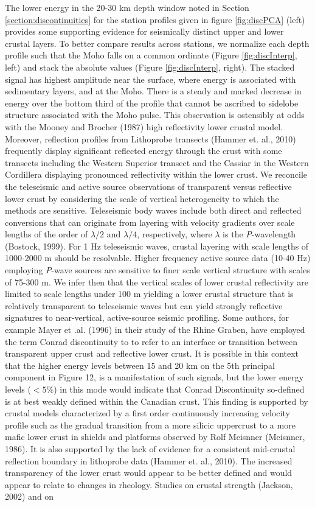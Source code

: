 \documentclass[review]{elsarticle}
\begin{document}
The lower energy in the 20-30 km depth window noted in Section \ref{section:discontinuities} for the station profiles given in figure \ref{fig:discPCA} (left) provides some supporting evidence for seismically distinct upper and lower crustal layers. To better compare results across stations, we normalize each depth profile such that the Moho falls on a common ordinate (Figure \ref{fig:discInterp}, left) and stack the absolute values (Figure \ref{fig:discInterp}, right). The stacked signal has highest amplitude near the surface, where energy is associated with sedimentary layers, and at the Moho. There is a steady and marked decrease in energy over the bottom third of the profile that cannot be ascribed to sidelobe structure associated with the Moho pulse. This observation is ostensibly at odds with the Mooney and Brocher (1987) high reflectivity lower crustal model. Moreover, reflection profiles from {\sc Lithoprobe} transects (Hammer et. al., 2010) frequently display significant reflected energy through the crust with some transects including the Western Superior transect and the Cassiar in the Western Cordillera displaying pronounced reflectivity within the lower crust. We reconcile the teleseismic and active source observations of transparent versus reflective lower crust by considering the scale of vertical heterogeneity to which the methods are sensitive. Teleseismic body waves include both direct and reflected conversions that can originate from layering with velocity gradients over scale lengths of the order of $\lambda/2$ and $\lambda/4$, respectively, where $\lambda$ is the {\it P}-wavelength (Bostock, 1999). For 1 Hz teleseismic waves, crustal layering with scale lengths of 1000-2000 m should be resolvable. Higher frequency active source data (10-40 Hz) employing {\it P}-wave sources are sensitive to finer scale vertical structure with scales of 75-300 m. We infer then that the vertical scales of lower crustal reflectivity are limited to scale lengths under 100 m yielding a lower crustal structure that is relatively transparent to teleseismic waves but can yield strongly reflective signatures to near-vertical, active-source seismic profiling.  Some authors, for example Mayer et .al. (1996) in their study of the Rhine Graben, have employed the term Conrad discontinuity to to refer to an interface or transition between transparent upper crust and reflective lower crust. It is possible in this context that the higher energy levels between 15 and 20 km on the 5th principal component in Figure 12, is a manifestation of such signals, but the lower energy levels ($<5\%$) in this mode would indicate that Conrad Discontinuity so-defined is at best weakly defined within the Canadian crust. This finding is supported by crustal models characterized by a first order continuously increasing velocity profile such as the gradual transition from a more silicic uppercrust to a more mafic lower crust in shields and platforms observed by Rolf Meisnner (Meisnner, 1986). It is also supported by the lack of evidence for a consistent mid-crustal reflection boundary in lithoprobe data (Hammer et. al., 2010). The increased transparency of the lower crust would appear to be better defined and would appear to relate to changes in rheology. Studies on crustal strength (Jackson, 2002) and on 
\end{document}
